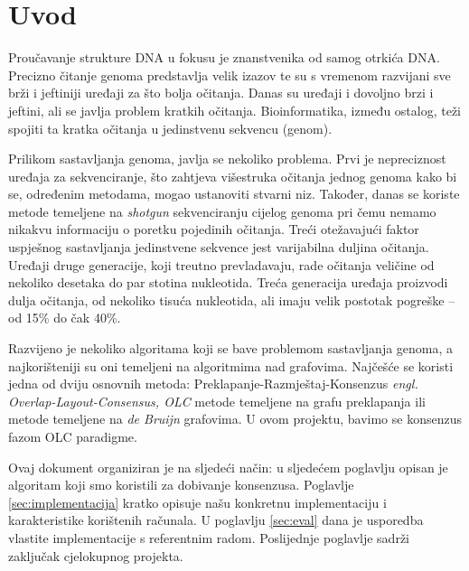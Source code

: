 \chapter{Uvod}

Proučavanje strukture DNA u fokusu je znanstvenika od samog otrkića DNA.
Precizno čitanje genoma predstavlja velik izazov te su s vremenom razvijani sve brži i jeftiniji uređaji za što bolja očitanja.
Danas su uređaji i dovoljno brzi i jeftini, ali se javlja problem kratkih očitanja.
Bioinformatika, između ostalog, teži spojiti ta kratka očitanja u jedinstvenu sekvencu (genom).

Prilikom sastavljanja genoma, javlja se nekoliko problema.
Prvi je nepreciznost uređaja za sekvenciranje, što zahtjeva višestruka očitanja jednog genoma kako bi se, određenim metodama, mogao ustanoviti stvarni niz.
Također, danas se koriste metode temeljene na \emph{shotgun} sekvenciranju cijelog genoma pri čemu nemamo nikakvu informaciju o poretku pojedinih očitanja.
Treći otežavajući faktor uspješnog sastavljanja jedinstvene sekvence jest varijabilna duljina očitanja.
Uređaji druge generacije, koji treutno prevladavaju, rade očitanja veličine od nekoliko desetaka do par stotina nukleotida.
Treća generacija uređaja proizvodi dulja očitanja, od nekoliko tisuća nukleotida, ali imaju velik postotak pogreške -- od 15\% do čak 40\%.

Razvijeno je nekoliko algoritama koji se bave problemom sastavljanja genoma, a najkorišteniji su oni temeljeni na algoritmima nad grafovima.
Najčešće se koristi jedna od dviju osnovnih metoda: Preklapanje-Razmještaj-Konsenzus \emph{engl. Overlap-Layout-Consensus, OLC} metode temeljene na grafu preklapanja ili metode temeljene na \emph{de Bruijn} grafovima.
U ovom projektu, bavimo se konsenzus fazom OLC paradigme.

Ovaj dokument organiziran je na sljedeći način: u sljedećem poglavlju opisan je algoritam koji smo koristili za dobivanje konsenzusa.
Poglavlje \ref{sec:implementacija} kratko opisuje našu konkretnu implementaciju i karakteristike korištenih računala.
U poglavlju \ref{sec:eval} dana je usporedba vlastite implementacije s referentnim radom.
Poslijednje poglavlje sadrži zaključak cjelokupnog projekta.


